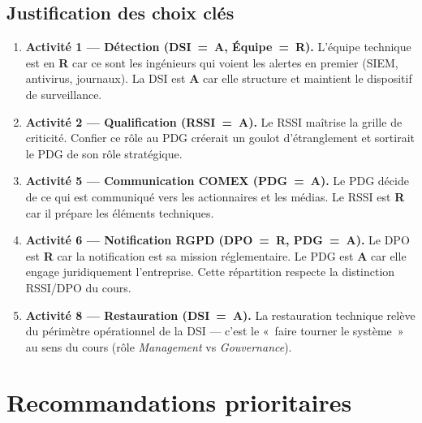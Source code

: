 \documentclass[12pt,a4paper]{article}
\begin{document}
\vspace{0.3em}
\legendeRACI

\subsection{Justification des choix clés}

\begin{enumerate}
    \item \textbf{Activité 1 --- Détection (DSI~=~A, Équipe~=~R).}
    L'équipe technique est en \textbf{R} car ce sont les ingénieurs qui
    voient les alertes en premier (SIEM, antivirus, journaux). La DSI
    est \textbf{A} car elle structure et maintient le dispositif de
    surveillance.

    \item \textbf{Activité 2 --- Qualification (RSSI~=~A).}
    Le RSSI maîtrise la grille de criticité. Confier ce rôle au PDG
    créerait un goulot d'étranglement et sortirait le PDG de son rôle
    stratégique.

    \item \textbf{Activité 5 --- Communication COMEX (PDG~=~A).}
    Le PDG décide de ce qui est communiqué vers les actionnaires et les
    médias. Le RSSI est \textbf{R} car il prépare les éléments techniques.

    \item \textbf{Activité 6 --- Notification RGPD (DPO~=~R, PDG~=~A).}
    Le DPO est \textbf{R} car la notification est sa mission
    réglementaire. Le PDG est \textbf{A} car elle engage juridiquement
    l'entreprise. Cette répartition respecte la distinction RSSI/DPO
    du cours.

    \item \textbf{Activité 8 --- Restauration (DSI~=~A).}
    La restauration technique relève du périmètre opérationnel de la DSI
    --- c'est le «~faire tourner le système~» au sens du cours (rôle
    \textit{Management} vs \textit{Gouvernance}).
\end{enumerate}

\separateur

\section{Recommandations prioritaires}
\end{document}
